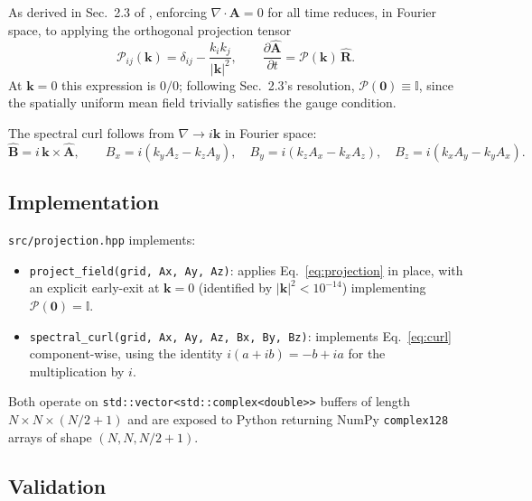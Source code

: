 \documentclass[11pt, a4paper]{article}
\newcommand{\pderiv}[2]{\frac{\partial #1}{\partial #2}}
\renewcommand{\div}{\nabla \cdot}
\begin{document}
As derived in Sec.~2.3 of \citealp{foundation2026}, enforcing
$\div\mathbf{A}=0$ for all time reduces, in Fourier space, to applying the
orthogonal projection tensor
\begin{equation}
    \mathcal{P}_{ij}(\mathbf{k}) = \delta_{ij} - \frac{k_i k_j}{|\mathbf{k}|^2},
    \qquad
    \pderiv{\hat{\mathbf{A}}}{t} = \mathcal{P}(\mathbf{k})\,\hat{\mathbf{R}}.
    \label{eq:projection}
\end{equation}
At $\mathbf{k}=0$ this expression is $0/0$; following Sec.~2.3's
resolution, $\mathcal{P}(\mathbf{0}) \equiv \mathbb{I}$, since the
spatially uniform mean field trivially satisfies the gauge condition.

The spectral curl follows from $\nabla \to i\mathbf{k}$ in Fourier space:
\begin{equation}
    \hat{\mathbf{B}} = i\,\mathbf{k} \times \hat{\mathbf{A}},
    \qquad
    B_x = i(k_y A_z - k_z A_y),\quad
    B_y = i(k_z A_x - k_x A_z),\quad
    B_z = i(k_x A_y - k_y A_x).
    \label{eq:curl}
\end{equation}

\subsection{Implementation}

\texttt{src/projection.hpp} implements:
\begin{itemize}
    \item \texttt{project\_field(grid, Ax, Ay, Az)}: applies
    Eq.~\eqref{eq:projection} in place, with an explicit early-exit at
    $\mathbf{k}=0$ (identified by $|\mathbf{k}|^2 < 10^{-14}$) implementing
    $\mathcal{P}(\mathbf{0})=\mathbb{I}$.
    \item \texttt{spectral\_curl(grid, Ax, Ay, Az, Bx, By, Bz)}: implements
    Eq.~\eqref{eq:curl} component-wise, using the identity
    $i(a+ib) = -b + ia$ for the multiplication by $i$.
\end{itemize}
Both operate on \texttt{std::vector<std::complex<double>>} buffers of
length $N \times N \times (N/2+1)$ and are exposed to Python returning
NumPy \texttt{complex128} arrays of shape $(N,N,N/2+1)$.

\subsection{Validation}
\end{document}
